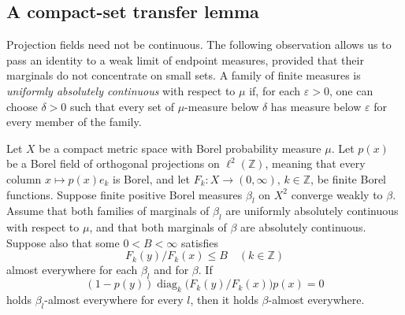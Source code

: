 \subsection{A compact-set transfer lemma}

Projection fields need not be continuous.  The following observation
allows us to pass an identity to a weak limit of endpoint measures, provided
that their marginals do not concentrate on small sets.  A family of
finite measures is \emph{uniformly absolutely continuous} with respect to
$\mu$ if, for each $\varepsilon>0$, one can choose $\delta>0$ such that every
set of $\mu$-measure below $\delta$ has measure below $\varepsilon$ for every
member of the family.

\begin{lemma}\label{lem:compact-transfer}
Let $X$ be a compact metric space with Borel probability measure $\mu$.
Let $p(x)$ be a Borel field of orthogonal projections on $\ell^2(\mathbb Z)$,
meaning that every column $x\mapsto p(x)e_k$ is Borel, and let
$F_k:X\to(0,\infty)$, $k\in\mathbb Z$, be finite Borel functions.  Suppose
finite positive Borel measures $\beta_l$ on $X^2$ converge weakly to $\beta$.
Assume that both families of marginals of $\beta_l$ are uniformly absolutely
continuous with respect to $\mu$, and that both marginals of $\beta$ are
absolutely continuous.  Suppose also that some $0<B<\infty$ satisfies
\[
 F_k(y)/F_k(x)\le B\quad(k\in\mathbb Z)
\]
almost everywhere for each $\beta_l$ and for $\beta$.  If
\begin{equation}\label{eq:compact-transfer-identity}
 (1-p(y))\operatorname{diag}_k\bigl(F_k(y)/F_k(x)\bigr)p(x)=0
\end{equation}
holds $\beta_l$-almost everywhere for every $l$, then it holds
$\beta$-almost everywhere.
\end{lemma}


